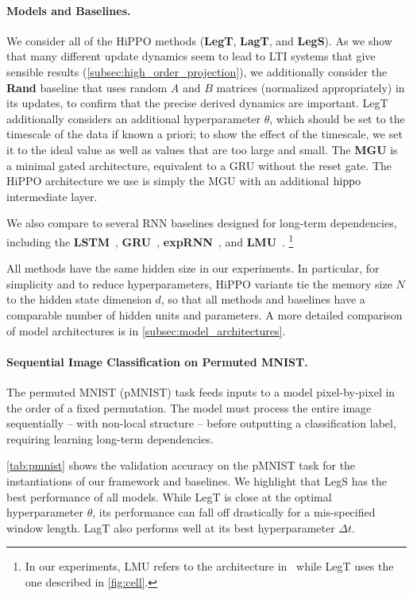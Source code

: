 \paragraph{Models and Baselines.}
We consider all of the HiPPO methods (\textbf{LegT}, \textbf{LagT}, and \textbf{LegS}).
As we show that many different update dynamics seem to lead to LTI systems that give sensible results (\cref{subsec:high_order_projection}), we additionally consider the \textbf{Rand} baseline that uses random $A$ and $B$ matrices (normalized appropriately) in its updates,
to confirm that the precise derived dynamics are important.
LegT additionally considers an additional hyperparameter $\theta$, which should be set to the timescale of the data if known a priori; to show the effect of the timescale, we set it to the ideal value as well as values that are too large and small.
The \textbf{MGU} is a minimal gated architecture, equivalent to a GRU without the reset gate. The HiPPO architecture we use is simply the MGU with an additional $\operatorname{hippo}$ intermediate layer.

We also compare to several RNN baselines designed for long-term dependencies, including the
\textbf{LSTM}~\cite{lstm}, \textbf{GRU}~\cite{chung2014empirical}, \textbf{expRNN}~\citep{lezcano2019cheap}, and \textbf{LMU}~\citep{voelker2019legendre}.%
\footnote{In our experiments, LMU refers to the architecture in~\citep{voelker2019legendre} while LegT uses the one described in \cref{fig:cell}.}

All methods have the same hidden size in our experiments.
In particular, for simplicity and to reduce hyperparameters, HiPPO variants tie the memory size $N$ to the hidden state dimension $d$, so that all methods and baselines have a comparable number of hidden units and parameters.
A more detailed comparison of model architectures is in \cref{subsec:model_architectures}.



\paragraph{Sequential Image Classification on Permuted MNIST.}
The permuted MNIST (pMNIST) task feeds inputs to a model pixel-by-pixel in the order of a fixed permutation.
The model must process the entire image sequentially -- with non-local structure -- before
outputting a classification label, requiring learning long-term dependencies.

\cref{tab:pmnist} shows the validation accuracy on the pMNIST task for
the instantiations of our framework and baselines.
We highlight that LegS has the best performance of all models.
While LegT is close at the optimal hyperparameter $\theta$, its performance can fall off drastically for a mis-specified window length.
LagT also performs well at its best hyperparameter $\Delta t$.

